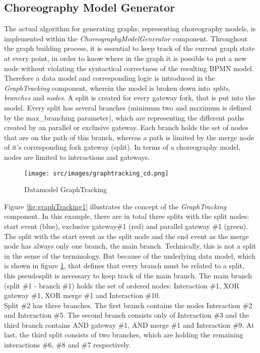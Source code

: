 \subsection{Choreography Model Generator}
The actual algorithm for generating graphs, representing choreography models, is implemented within the \textit{ChoreographyModelGenerator} component. Throughout the graph building process, it is essential to keep track of the current graph state at every point, in order to know where in the graph it is possible to put a new node without violating the syntactical correctness of the resulting BPMN model.  
Therefore a data model and corresponding logic is introduced in the \textit{GraphTracking} component, 
wherein the model is broken down into \textit{splits}, \textit{branches} and \textit{nodes}. A split is created for every gateway fork, that is put into the model. Every split has several branches (minimum two and maximum is defined by the max\_branching parameter), 
which are representing the different paths created by an parallel or exclusive gateway.    
Each branch holds the set of nodes that are on the path of this branch, whereas a path is limited by the merge node of it's corresponding fork gateway (split). In terms of a choreography model, nodes are limited to interactions and gateways.

\begin{figure}[H]
\texttt{[image: src/images/graphtracking\_cd.png]}
\caption{Datamodel GraphTracking}
\label{fig:graphTracking2}
\end{figure}

Figure \ref{fig:graphTracking1} illustrates the concept of the \textit{GraphTracking} component. In this example, there are in total three splits with the split nodes: start event (blue), exclusive gateway\#1 (red) and parallel gateway \#1 (green). The split with the start event as the split node and the end event as the merge node has always only one branch, the main branch. Technically, this is not a split in the sense of the terminology. But because of the underlying data model, which is shown in figure \ref{fig:graphTracking2}, that defines that every branch must be related to a split, this pseudosplit is necessary to keep track of the main branch. The main branch (split \#1 - branch \#1) holds the set of ordered nodes: Interaction \#1, XOR gateway \#1, XOR merge \#1 and Interaction \#10.\\
Split \#2 has three branches. The first branch contains the nodes Interaction \#2 and Interaction \#5. The second branch consists only of Interaction \#3 and the third branch contains AND gateway \#1, AND merge \#1 and Interaction \#9. At last, the third split consists of two branches, which are holding the remaining interactions \#6, \#8 and \#7 respectively. 

